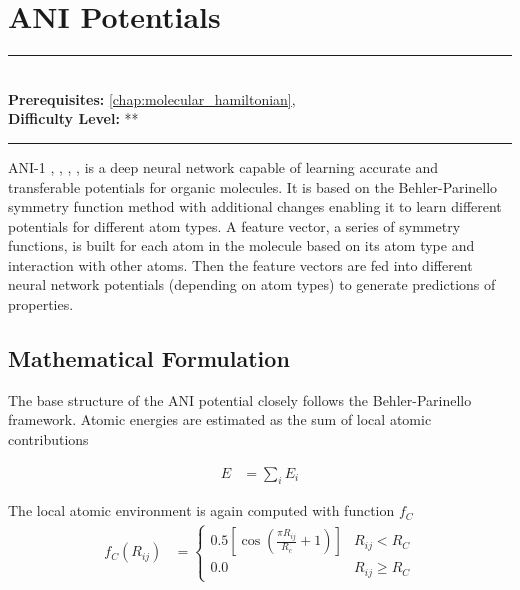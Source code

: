 \documentclass[book.tex]{subfiles}
\begin{document}
\chapter{ANI Potentials}
\label{chap:ani}
\noindent\rule{11cm}{0.4pt} \\
\textbf{Prerequisites:}  \autoref{chap:molecular_hamiltonian},   \\
\textbf{Difficulty Level:} ** \\
\noindent\rule{11cm}{0.4pt}
\vspace{5mm}

ANI-1 \cite{smith2017anidata}, \cite{smith2019approaching}, \cite{smith2020ani}, \cite{gao2020torchani}, \cite{devereux2020extending} is a deep neural network capable of learning accurate and transferable potentials for organic molecules. It is based on the Behler-Parinello symmetry function method \cite{behler2007generalized} with additional changes enabling it to learn different potentials for different atom types. A feature vector, a series of symmetry functions, is built for each atom in the molecule based on its atom type and interaction with other atoms. Then the feature vectors are fed into different neural network potentials (depending on atom types) to generate predictions of properties. %

\section{Mathematical Formulation}

The base structure of the ANI potential closely follows the Behler-Parinello framework. Atomic energies are estimated as the sum of local atomic contributions

\begin{align}
E &= \sum_i E_i
\end{align}

The local atomic environment is again computed with function $f_C$
\begin{align}
f_C(R_{ij}) &= \begin{cases}
0.5 \left [ \cos \left ( \frac{\pi R_{ij}}{R_c} +  1 \right ) \right ] & R_{ij} < R_C \\
0.0 & R_{ij} \geq R_C
\end{cases}
\end{align}
\end{document}
